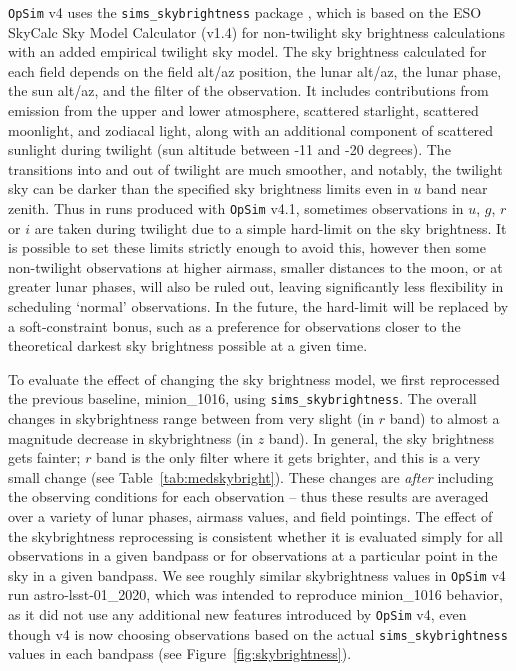 \documentclass[DM,lsstdraft,authoryear,toc]{lsstdoc}
\newcommand{\opsim}{\texttt{OpSim}\xspace}
\newcommand{\simsky}{\texttt{sims\_skybrightness}\xspace}
\begin{document}
\opsim v4 uses the \simsky package \citep{2016SPIE.9910E..1AY}, which is based on the ESO SkyCalc Sky Model Calculator  (v1.4) for non-twilight sky brightness calculations with an added empirical twilight sky model. The sky brightness calculated for each field depends on the field alt/az position, the lunar alt/az, the lunar phase, the sun alt/az, and the filter of the observation. It includes contributions from emission from the upper and lower atmosphere, scattered starlight, scattered moonlight, and zodiacal light, along with an additional component of scattered sunlight during twilight (sun altitude between -11 and -20 degrees). The transitions into and out of twilight are much smoother, and notably, the twilight sky can be darker than the specified sky brightness limits even in $u$ band near zenith. Thus in runs produced with \opsim v4.1, sometimes observations in $u$, $g$, $r$ or $i$ are taken during twilight due to a simple hard-limit on the sky brightness. It is possible to set these limits strictly enough to avoid this, however then some non-twilight observations at higher airmass, smaller distances to the moon, or at greater lunar phases, will also be ruled out, leaving significantly less flexibility in scheduling `normal' observations. In the future, the hard-limit will be replaced by a soft-constraint bonus, such as a preference for observations closer to the theoretical darkest sky brightness possible at a given time.


To evaluate the effect of changing the sky brightness model, we first reprocessed the previous baseline, minion\_1016, using \simsky. The overall changes in skybrightness range between from very slight (in $r$ band) to almost a magnitude decrease in skybrightness (in $z$ band). In general, the sky brightness gets fainter; $r$ band is the only filter where it gets brighter, and this is a very small change (see Table~\ref{tab:medskybright}). These changes are {\it after} including the observing conditions for each observation -- thus these results are averaged over a variety of lunar phases, airmass values, and field pointings. The effect of the skybrightness reprocessing is consistent whether it is evaluated simply for all observations in a given bandpass or for observations at a particular point in the sky in a given bandpass. We see roughly similar skybrightness values in \opsim v4 run astro-lsst-01\_2020, which was intended to reproduce minion\_1016 behavior, as it did not use any additional new features introduced by \opsim v4, even though v4 is now choosing observations based on the actual \simsky values in each bandpass (see Figure~\ref{fig:skybrightness}).
\end{document}
